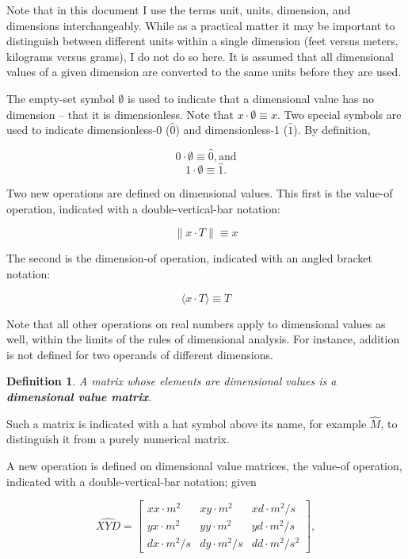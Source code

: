 \documentclass[10pt,letterpaper]{article}
\newtheorem{defn}{Definition}[section]
\numberwithin{equation}{section}
\begin{document}
Note that in this document I use the terms unit, units, dimension, and
dimensions interchangeably.  While as a practical matter it may be
important to distinguish between different units within a single
dimension (feet versus meters, kilograms versus grams), I do not do so
here.  It is assumed that all dimensional values of a given dimension
are converted to the same units before they are used.
 
The empty-set symbol $\emptyset$ is used to indicate that a
dimensional value has no dimension – that it is dimensionless.  Note
that $x \cdot \emptyset \equiv x$.  Two special symbols are used to
indicate dimensionless-0 ($\hat 0$) and dimensionless-1 ($\hat 1$).
By definition,
 
 \[ 0 \cdot \emptyset \equiv \hat 0, \mbox{and} \]
 \[ 1 \cdot \emptyset \equiv \hat 1. \]

Two new operations are defined on dimensional values.  This first is
the value-of operation, indicated with a double-vertical-bar
notation:

\[ \| x \cdot T \| \equiv x \]

The second is the dimension-of operation, indicated with an angled
bracket notation:

\[ \langle x \cdot T \rangle \equiv T \]

Note that all other operations on real numbers apply to dimensional
values as well, within the limits of the rules of dimensional
analysis.  For instance, addition is not defined for two operands of
different dimensions.


\begin{defn}A matrix whose elements are dimensional values is a
  \textbf{dimensional value matrix}.\end{defn}

Such a matrix is indicated with a hat symbol above its name, for
example $\hat M$, to distinguish it from a purely numerical matrix.

A new operation is defined on dimensional value matrices, the value-of
operation, indicated with a double-vertical-bar notation; given

\[ \widehat{XYD} = \left[ \begin{matrix} 
  xx \cdot m^2 & xy \cdot m^2 & xd \cdot m^2/s \\
  yx \cdot m^2 & yy \cdot m^2 & yd \cdot m^2/s \\
  dx \cdot m^2/s & dy \cdot m^2/s & dd \cdot m^2/s^2
 \end{matrix} \right], \]
 
\end{document}
